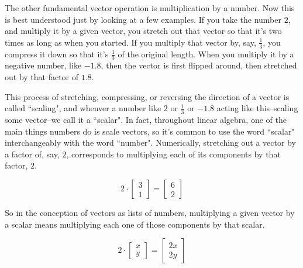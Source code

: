 The other fundamental vector operation is multiplication by a number. Now this
is best understood just by looking at a few examples. If you take the number
$2$, and multiply it by a given vector, you stretch out that vector so that it's
two times as long as when you started. If you multiply that vector by, say,
$\frac{1}{3}$, you compress it down so that it's $\frac{1}{3}$ of the original
length. When you multiply it by a negative number, like $-1.8$, then the vector
is first flipped around, then stretched out by that factor of $1.8$.

This process of stretching, compressing, or reversing the direction of a vector
is called ``scaling", and whenver a number like $2$ or $\frac{1}{3}$ or $-1.8$
acting like this--scaling some vector--we call it a ``scalar". In fact,
throughout linear algebra, one of the main things numbers do is scale vectors,
so it's common to use the word ``scalar" interchangeably with the word
``number". Numerically, stretching out a vector by a factor of, say, $2$,
corresponds to multiplying each of its components by that factor, $2$.

\begin{equation*}
  2 \cdot \begin{bmatrix}
    3 \\
    1
  \end{bmatrix} = \begin{bmatrix}
    6 \\
    2
  \end{bmatrix}
\end{equation*}

So in the conception of vectors as lists of numbers, multiplying a given vector
by a scalar means multiplying each one of those components by that scalar.

\begin{equation*}
  2 \cdot \begin{bmatrix}
    x \\
    y
  \end{bmatrix} = \begin{bmatrix}
    2x \\
    2y
  \end{bmatrix}
\end{equation*}
